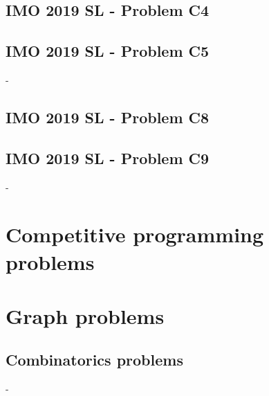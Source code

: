 \documentclass[12pt,openany,oneside]{book}
\theoremstyle{definition}
\numberwithin{definition}{section}
\numberwithin{theorem}{section}
\numberwithin{corollary}{section}
\numberwithin{proposition}{section}
\numberwithin{notation}{section}
\numberwithin{remark}{section}
\numberwithin{hypothesis}{section}
\numberwithin{example}{section}
\begin{document}
\section{IMO 2019 SL - Problem C4}

\section{IMO 2019 SL - Problem C5}-
\section{IMO 2019 SL - Problem C8}

\section{IMO 2019 SL - Problem C9}-

\chapter{Competitive programming problems}

\chapter{Graph problems}
\section{Combinatorics problems}-



\end{document}
